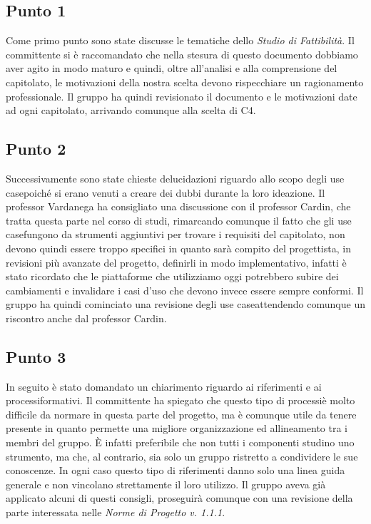     \subsection{Punto 1}
        Come primo punto sono state discusse le tematiche dello \textit{Studio di Fattibilità}. Il committente si è raccomandato che nella stesura di questo documento dobbiamo aver agito in modo maturo e quindi, oltre all'analisi e alla comprensione del capitolato\glo, le motivazioni della nostra scelta devono rispecchiare un ragionamento professionale. Il gruppo ha quindi revisionato il documento e le motivazioni date ad ogni capitolato\glo, arrivando comunque alla scelta di C4.
    \subsection{Punto 2}
        Successivamente sono state chieste delucidazioni riguardo allo scopo degli use case\glosp poiché si erano venuti a creare dei dubbi durante la loro ideazione. Il professor Vardanega ha consigliato una discussione con il professor Cardin, che tratta questa parte nel corso di studi, rimarcando comunque il fatto che gli use case\glosp fungono da strumenti aggiuntivi per trovare i requisiti del capitolato\glo, non devono quindi essere troppo specifici in quanto sarà compito del progettista, in revisioni più avanzate del progetto\glo, definirli in modo implementativo, infatti è stato ricordato che le piattaforme che utilizziamo oggi potrebbero subire dei cambiamenti e invalidare i casi d'uso che devono invece essere sempre conformi. Il gruppo ha quindi cominciato una revisione degli use case\glosp attendendo comunque un riscontro anche dal professor Cardin.
    \subsection{Punto 3}
        In seguito è stato domandato un chiarimento riguardo ai riferimenti e ai processi\glosp formativi. Il committente ha spiegato che questo tipo di processi\glosp è molto difficile da normare in questa parte del progetto\glo, ma è comunque utile da tenere presente in quanto permette una migliore organizzazione ed allineamento tra i membri del gruppo. È infatti preferibile che non tutti i componenti studino uno strumento, ma che, al contrario, sia solo un gruppo ristretto a condividere le sue conoscenze. In ogni caso questo tipo di riferimenti danno solo una linea guida generale e non vincolano strettamente il loro utilizzo. Il gruppo aveva già applicato alcuni di questi consigli, proseguirà comunque con una revisione della parte interessata nelle \textit{Norme di Progetto v. 1.1.1}.
